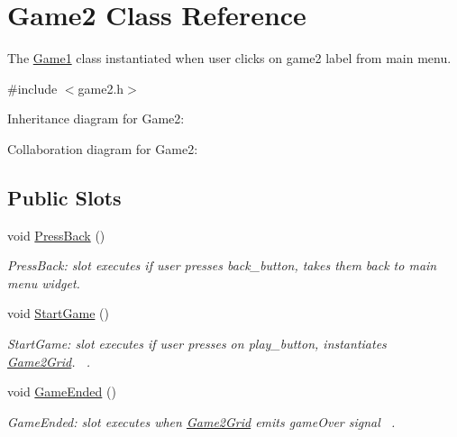 \hypertarget{classGame2}{}\section{Game2 Class Reference}
\label{classGame2}


The \hyperlink{classGame1}{Game1} class instantiated when user clicks on game2 label from main menu.  




{\ttfamily \#include $<$game2.\+h$>$}



Inheritance diagram for Game2\+:


Collaboration diagram for Game2\+:
\subsection*{Public Slots}
\begin{DoxyCompactItemize}
\item 
void \hyperlink{classGame2_a06e537364fffde28c04697db4855ade0}{Press\+Back} ()
\begin{DoxyCompactList}\small\item\em Press\+Back\+: slot executes if user presses back\+\_\+button, takes them back to main menu widget. \end{DoxyCompactList}\item 
void \hyperlink{classGame2_a2f51124a2ec3758fbc1bfd056ca137b6}{Start\+Game} ()
\begin{DoxyCompactList}\small\item\em Start\+Game\+: slot executes if user presses on play\+\_\+button, instantiates \hyperlink{classGame2Grid}{Game2\+Grid}.~\newline
. \end{DoxyCompactList}\item 
void \hyperlink{classGame2_a39a8191a0c66453ed1070db56415f2a9}{Game\+Ended} ()
\begin{DoxyCompactList}\small\item\em Game\+Ended\+: slot executes when \hyperlink{classGame2Grid}{Game2\+Grid} emits game\+Over signal~\newline
. \end{DoxyCompactList}\end{DoxyCompactItemize}
